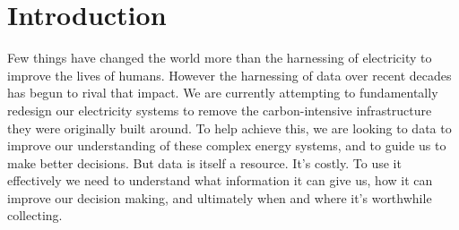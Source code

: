 
\chapter{Introduction} \label{chap:introduction}



\begin{cbox}[colback=black!5!white]{}
Few things have changed the world more than the harnessing of electricity to improve the lives of humans. However the harnessing of data over recent decades has begun to rival that impact. We are currently attempting to fundamentally redesign our electricity systems to remove the carbon-intensive infrastructure they were originally built around. To help achieve this, we are looking to data to improve our understanding of these complex energy systems, and to guide us to make better decisions. But data is itself a resource. It's costly. To use it effectively we need to understand what information it can give us, how it can improve our decision making, and ultimately when and where it's worthwhile collecting.
\end{cbox}

\hfill \\[-1em]


